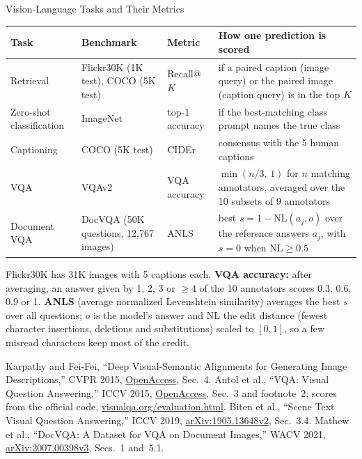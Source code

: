 \begin{frame}{Vision-Language Tasks and Their Metrics}

  {\centering\scriptsize\setlength{\tabcolsep}{4pt}
  \begin{tabular}{>{\raggedright\arraybackslash}p{1.9cm} >{\raggedright\arraybackslash}p{3.0cm} >{\raggedright\arraybackslash}p{1.6cm} >{\raggedright\arraybackslash}p{5.9cm}}
    \toprule
    \textbf{Task} & \textbf{Benchmark} & \textbf{Metric} & \textbf{How one prediction is scored} \\
    \midrule
    Retrieval & Flickr30K (1K test), COCO (5K test) & Recall@$K$ & 1 if a paired caption (image query) or the paired image (caption query) is in the top $K$ \\
    \addlinespace[0.2em]
    Zero-shot classification & ImageNet & top-1 accuracy & 1 if the best-matching class prompt names the true class \\
    \addlinespace[0.2em]
    Captioning & COCO (5K test) & CIDEr & consensus with the 5 human captions \\
    \addlinespace[0.2em]
    VQA & VQAv2 & VQA accuracy & $\min(n/3,\,1)$ for $n$ matching annotators, averaged over the 10 subsets of 9 annotators \\
    \addlinespace[0.2em]
    Document VQA & DocVQA (50K questions, 12,767 images) & ANLS & best $s = 1-\mathrm{NL}(a_j, o)$ over the reference answers $a_j$, with $s = 0$ when $\mathrm{NL} \geq 0.5$ \\
    \bottomrule
  \end{tabular}\par}
  \vspace{0.3em}
  {\scriptsize Flickr30K has 31K images with 5 captions each. \textbf{VQA accuracy:} after averaging, an answer given by 1, 2, 3 or $\geq 4$ of the 10 annotators scores 0.3, 0.6, 0.9 or 1. \textbf{ANLS} (average normalized Levenshtein similarity) averages the best $s$ over all questions; $o$ is the model's answer and NL the edit distance (fewest character insertions, deletions and substitutions) scaled to $[0,1]$, so a few misread characters keep most of the credit.\par}
  \vspace{0.3em}
  {\scriptsize Karpathy and Fei-Fei, ``Deep Visual-Semantic Alignments for Generating Image Descriptions,'' CVPR 2015, \href{https://openaccess.thecvf.com/content_cvpr_2015/papers/Karpathy_Deep_Visual-Semantic_Alignments_2015_CVPR_paper.pdf}{OpenAccess}, Sec.~4. Antol et al., ``VQA: Visual Question Answering,'' ICCV 2015, \href{https://openaccess.thecvf.com/content_iccv_2015/papers/Antol_VQA_Visual_Question_ICCV_2015_paper.pdf}{OpenAccess}, Sec.~3 and footnote~2; scores from the official code, \href{https://visualqa.org/evaluation.html}{visualqa.org/evaluation.html}. Biten et al., ``Scene Text Visual Question Answering,'' ICCV 2019, \href{https://arxiv.org/abs/1905.13648v2}{arXiv:1905.13648v2}, Sec.~3.4. Mathew et al., ``DocVQA: A Dataset for VQA on Document Images,'' WACV 2021, \href{https://arxiv.org/abs/2007.00398v3}{arXiv:2007.00398v3}, Secs.~1 and~5.1.\par}
\end{frame}

